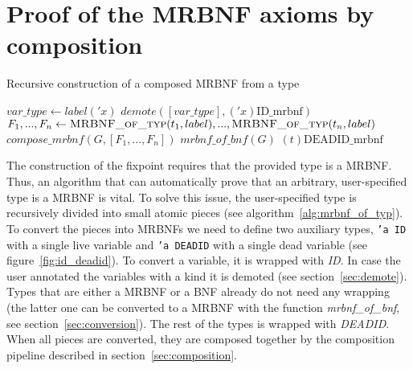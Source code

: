 \section{Proof of the \acs{MRBNF} axioms by composition}\label{sec:mrbnf_of_typ}

\begin{algorithm}
\caption{Recursive construction of a composed \ac{MRBNF} from a type}\label{alg:mrbnf_of_typ}
\begin{algorithmic}[1]
    \State $\textit{var\_type}\gets label('x)$ \Comment{\textcolor{darkgreen}{is $'x$ Live, Free, Bound or Dead?}}
    \State \Return $\textit{demote}([\textit{var\_type}], ('x)\text{ID\_mrbnf})$
    \State $F_1,...,F_n\gets \Call{MRBNF\_of\_typ}{t_1, label},...,\Call{MRBNF\_of\_typ}{t_n, label}$
    \State \Return $\textit{compose\_mrbnf}(G, [F_1,...,F_n])$
    \State $\textit{mrbnf\_of\_bnf}(G)$ \Comment{\textcolor{darkgreen}{Convert G to a MRBNF and register it for future use}}
    \State \Return {}
  \Else
    \State \Return $(t)\text{DEADID\_mrbnf}$
  \EndIf
\EndFunction
\end{algorithmic}
\end{algorithm}

The construction of the fixpoint requires that the provided type is a \ac{MRBNF}. Thus, an algorithm that can automatically prove that an arbitrary, user-specified type is a \ac{MRBNF} is vital. To solve this issue, the user-specified type is recursively divided into small atomic pieces (see algorithm~\ref{alg:mrbnf_of_typ}). To convert the pieces into \acp{MRBNF} we need to define two auxiliary types, \texttt{'a ID} with a single live variable and \texttt{'a DEADID} with a single dead variable (see figure~\ref{fig:id_deadid}). To convert a variable, it is wrapped with \textit{ID}. In case the user annotated the variables with a kind it is demoted (see section~\ref{sec:demote}). Types that are either a \ac{MRBNF} or a \ac{BNF} already do not need any wrapping (the latter one can be converted to a \ac{MRBNF} with the function \textit{mrbnf\_of\_bnf}, see section~\ref{sec:conversion}). The rest of the types is wrapped with \textit{DEADID}. When all pieces are converted, they are composed together by the composition pipeline described in section~\ref{sec:composition}.

